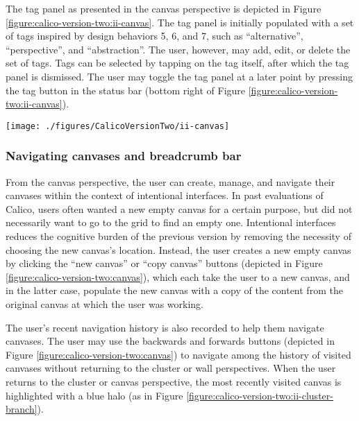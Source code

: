 The tag panel as presented in the canvas perspective is depicted in Figure \ref{figure:calico-version-two:ii-canvas}. The tag panel is initially populated with a set of tags inspired by design behaviors 5, 6, and 7, such as ``alternative'', ``perspective'', and ``abstraction''. The user, however, may add, edit, or delete the set of tags. Tags can be selected by tapping on the tag itself, after which the tag panel is dismissed. The user may toggle the tag panel at a later point by pressing the tag button in the status bar (bottom right of Figure \ref{figure:calico-version-two:ii-canvas}).

\begin{figure*}[tbh]
  \centering
  \texttt{[image: ./figures/CalicoVersionTwo/ii-canvas]}
  \caption{The tag panel appears in the upper-right upon entering a newly created canvas.}
  \label{figure:calico-version-two:ii-canvas}
\end{figure*}

\subsubsection{Navigating canvases and breadcrumb bar} 

From the canvas perspective, the user can create, manage, and navigate their canvases within the context of intentional interfaces. In past evaluations of Calico, users often wanted a new empty canvas for a certain purpose, but did not necessarily want to go to the grid to find an empty one. Intentional interfaces reduces the cognitive burden of the previous version by removing the necessity of choosing the new canvas's location. Instead, the user creates a new empty canvas by clicking the ``new canvas'' or ``copy canvas'' buttons (depicted in Figure \ref{figure:calico-version-two:canvas}), which each take the user to a new canvas, and in the latter case, populate the new canvas with a copy of the content from the original canvas at which the user was working.

The user's recent navigation history is also recorded to help them navigate canvases. The user may use the backwards and forwards buttons (depicted in Figure \ref{figure:calico-version-two:canvas}) to navigate among the history of visited canvases without returning to the cluster or wall perspectives. When the user returns to the cluster or canvas perspective, the most recently visited canvas is highlighted with a blue halo (as in Figure \ref{figure:calico-version-two:ii-cluster-branch}).


